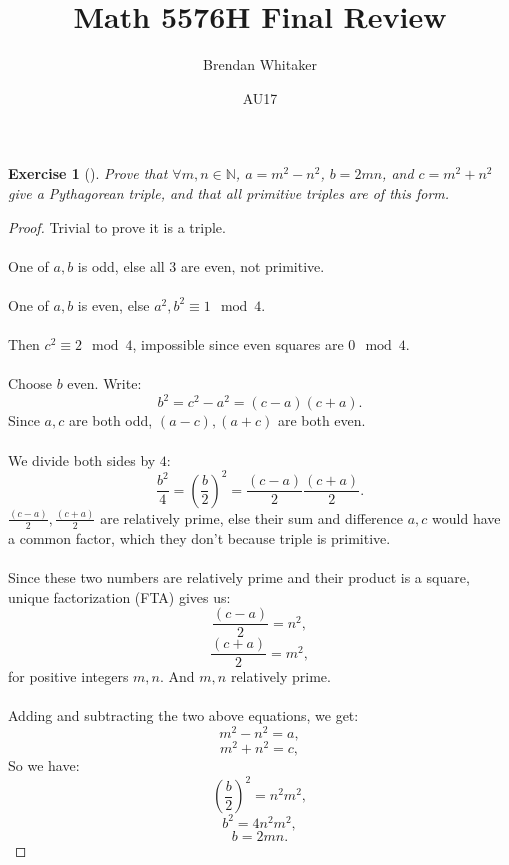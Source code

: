 \documentclass[10pt,oneside,reqno]{amsart}
\theoremstyle{plain}
\newtheorem*{e}{Exercise}
\theoremstyle{definition}
\begin{document}
\title{Math 5576H Final Review}

\date{AU17}

\author[Brendan Whitaker]{Brendan Whitaker}

\maketitle

\begin{e}[]
Prove that $\forall m,n \in \mathbb{N}$, $a = m^2 - n^2$, $b = 2mn$, and $c = m^2 + n^2$ give a Pythagorean triple, and that all primitive triples are of this form. 
\end{e}
\begin{proof}
Trivial to prove it is a triple.\\\\
One of $a,b$ is odd, else all 3 are even, not primitive. \\\\
One of $a,b$ is even, else $a^2,b^2 \equiv 1 \mod 4$. \\\\
Then $c^2 \equiv 2 \mod 4$, impossible since even squares are $0 \mod 4$. \\\\
Choose $b$ even. Write:
$$
b^2 = c^2 - a^2 = (c - a)(c + a). 
$$
Since $a,c$ are both odd, $(a - c),(a + c)$ are both even. \\\\
We divide both sides by $4$:
$$
\frac{b^2}{4} = \left(\frac{b}{2}\right)^2 = \frac{(c - a)}{2}\frac{(c + a)}{2}. 
$$
$\frac{(c - a)}{2},\frac{(c + a)}{2}$ are relatively prime, else their sum and difference $a,c$ would have a common factor, which they don't because triple is primitive. \\\\
Since these two numbers are relatively prime and their product is a square, unique factorization (FTA) gives us:
$$
\frac{(c - a)}{2} = n^2,
$$
$$
\frac{(c + a)}{2} = m^2,
$$
for positive integers $m,n$. And $m,n$ relatively prime. \\\\
Adding and subtracting the two above equations, we get: 
$$
m^2 - n^2 = a,
$$
$$
m^2 + n^2 = c,
$$
So we have:
$$
\left(\frac{b}{2}\right)^2 = n^2m^2,
$$
$$
b^2 = 4n^2m^2,
$$
$$
b = 2mn. 
$$


\end{proof}
\end{document}
